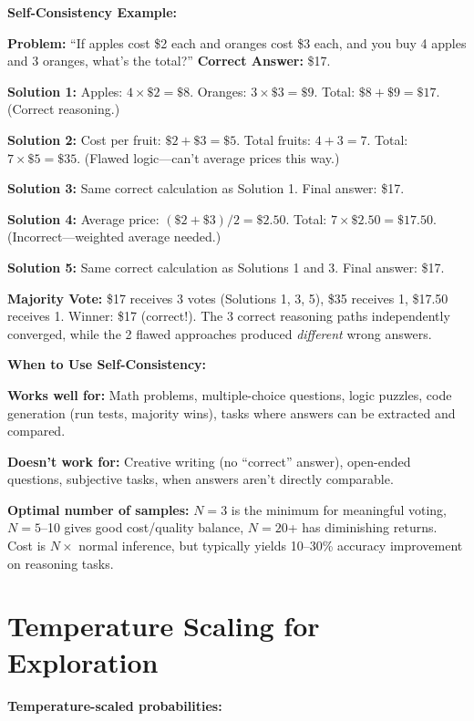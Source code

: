 \begin{chapterenv}
\textbf{Self-Consistency Example:}

\textbf{Problem:} ``If apples cost \$2 each and oranges cost \$3 each, and you buy 4 apples and 3 oranges, what's the total?'' \textbf{Correct Answer:} \$17.

\textbf{Solution 1:} Apples: $4 \times \$2 = \$8$. Oranges: $3 \times \$3 = \$9$. Total: $\$8 + \$9 = \$17$. (Correct reasoning.)

\textbf{Solution 2:} Cost per fruit: $\$2 + \$3 = \$5$. Total fruits: $4 + 3 = 7$. Total: $7 \times \$5 = \$35$. (Flawed logic---can't average prices this way.)

\textbf{Solution 3:} Same correct calculation as Solution 1. Final answer: \$17.

\textbf{Solution 4:} Average price: $(\$2 + \$3)/2 = \$2.50$. Total: $7 \times \$2.50 = \$17.50$. (Incorrect---weighted average needed.)

\textbf{Solution 5:} Same correct calculation as Solutions 1 and 3. Final answer: \$17.

\textbf{Majority Vote:} \$17 receives 3 votes (Solutions 1, 3, 5), \$35 receives 1, \$17.50 receives 1. Winner: \$17 (correct!). The 3 correct reasoning paths independently converged, while the 2 flawed approaches produced \textit{different} wrong answers.

\begin{tipbox}
\textbf{When to Use Self-Consistency:}

\textbf{Works well for:} Math problems, multiple-choice questions, logic puzzles, code generation (run tests, majority wins), tasks where answers can be extracted and compared.

\textbf{Doesn't work for:} Creative writing (no ``correct'' answer), open-ended questions, subjective tasks, when answers aren't directly comparable.

\textbf{Optimal number of samples:} $N=3$ is the minimum for meaningful voting, $N=5$--10 gives good cost/quality balance, $N=20$+ has diminishing returns. Cost is $N \times$ normal inference, but typically yields 10--30\% accuracy improvement on reasoning tasks.
\end{tipbox}

\section{Temperature Scaling for Exploration}

\begin{infobox}
\textbf{Temperature-scaled probabilities:}


\end{infobox}
\end{chapterenv}

